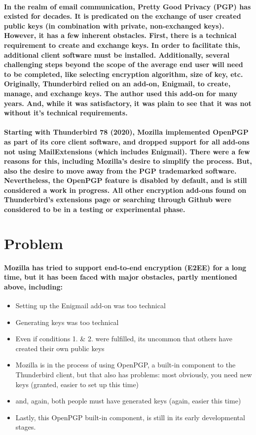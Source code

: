 \paragraph{In the realm of email communication, Pretty Good Privacy (PGP) has existed for decades. It is predicated on the exchange of user created public keys (in combination with private, non-exchanged keys). However, it has a few inherent obstacles. First, there is a technical requirement to create and exchange keys. In order to facilitate this, additional client software must be installed. Additionally, several challenging steps beyond the scope of the average end user will need to be completed, like selecting encryption algorithm, size of key, etc. Originally, Thunderbird relied on an add-on, Enigmail, to create, manage, and exchange keys. The author used this add-on for many years. And, while it was satisfactory, it was plain to see that it was not without it's technical requirements.}

\paragraph{Starting with Thunderbird 78 (2020), Mozilla implemented OpenPGP as part of its core client software, and dropped support for all add-ons not using MailExtensions (which includes Enigmail). There were a few reasons for this, including Mozilla's desire to simplify the process. But, also the desire to move away from the PGP trademarked software. Nevertheless, the OpenPGP feature is disabled by default, and is still considered a work in progress. All other encryption add-ons found on Thunderbird's extensions page or searching through Github were considered to be in a testing or experimental phase.}

\section{Problem}

\paragraph{Mozilla has tried to support end-to-end encryption (E2EE) for a long time, but it has been faced with major obstacles, partly mentioned above, including:}

\begin{itemize}
\item Setting up the Enigmail add-on was too technical
\item Generating keys was too technical
\item Even if conditions 1. \& 2. were fulfilled, its uncommon that others have created their own public keys
\item Mozilla is in the process of using OpenPGP, a built-in component to the Thunderbird client, but that also has problems: most obviously, you need new keys (granted, easier to set up this time)
\item and, again, both people must have generated keys (again, easier this time)
\item Lastly, this OpenPGP built-in component, is still in its early developmental stages.
\end{itemize}

